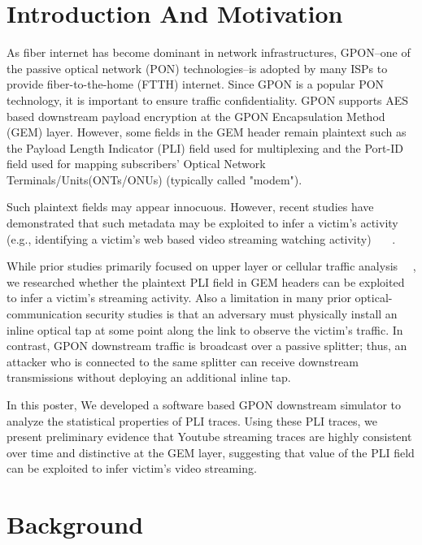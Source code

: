 \documentclass[sigconf,anonymous]{acmart}
\begin{document}
\maketitle

\section{Introduction And Motivation}
As fiber internet has become dominant in network infrastructures, GPON--one of the passive optical network (PON) technologies--is adopted by many ISPs to provide fiber-to-the-home (FTTH) internet. Since GPON is a popular PON technology, it is important to ensure traffic confidentiality. 
 GPON supports AES based downstream payload encryption at the GPON Encapsulation Method (GEM) layer. However, some fields in the GEM header remain plaintext such as the Payload Length Indicator (PLI) field used for multiplexing and the Port-ID field used for mapping subscribers' Optical Network Terminals/Units(ONTs/ONUs) (typically called "modem").

Such plaintext fields may appear innocuous. However, recent studies have demonstrated that such metadata may be exploited to infer a victim's activity (e.g., identifying a victim's web based video streaming watching activity) ~\cite{bae-sec22}~\cite{ytyt}~\cite{ytyt2}.

While prior studies primarily focused on upper layer or cellular traffic analysis~\cite{bae-sec22}~\cite{ytyt} , we researched whether the plaintext PLI field in GEM headers can be exploited to infer a victim's streaming activity. 
Also a limitation in many prior optical-communication security studies is that an adversary must physically install an inline optical tap at some point along the link to observe the victim's traffic. In contrast, GPON downstream traffic is broadcast over a passive splitter; thus, an attacker who is connected to the same splitter can receive downstream transmissions without deploying an additional inline tap.

In this poster, We developed a software based GPON downstream simulator to analyze the statistical properties of PLI traces. Using these PLI traces, we present preliminary evidence that Youtube streaming traces are highly consistent over time and distinctive at the GEM layer, suggesting that value of the PLI field can be exploited to infer victim's video streaming.
\section{Background}  
\end{document}
